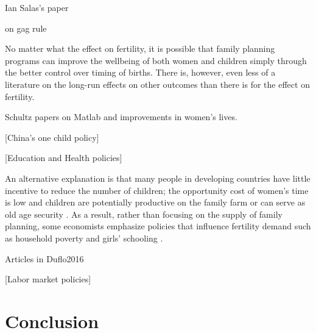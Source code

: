 \documentclass[letterpaper,12pt]{article}
\begin{document}
\citet{Dumas2017}

Ian Salas's paper 

\citet{Jones2015} on gag rule

No matter what the effect on fertility, it is possible that 
family planning programs can improve the wellbeing of both women and 
children simply through the better control over timing of births.
There is, however, even less of a literature on the long-run effects on
other outcomes than there is for the effect on fertility.

Schultz papers on Matlab and improvements in women's lives.


[China's one child policy]

\citep{Li2005}


\citet{Rosenzweig2009} 

[Education and Health policies]

An alternative explanation is that many people in developing countries 
have little incentive to reduce the number of children;
the opportunity cost of women's time is low and children are potentially 
productive on the family farm or can serve as old age security
\citep{Banerjee2014,Lambert2016}.
As a result, rather than focusing on the supply of family planning, 
some economists emphasize policies that influence fertility demand 
such as household poverty and girls' schooling 
\citep{pritchett94a,DasGupta2011}.

Articles in Duflo2016

\citet{Ainsworth1996}

[Labor market policies]


\section{Conclusion}




\end{document}
